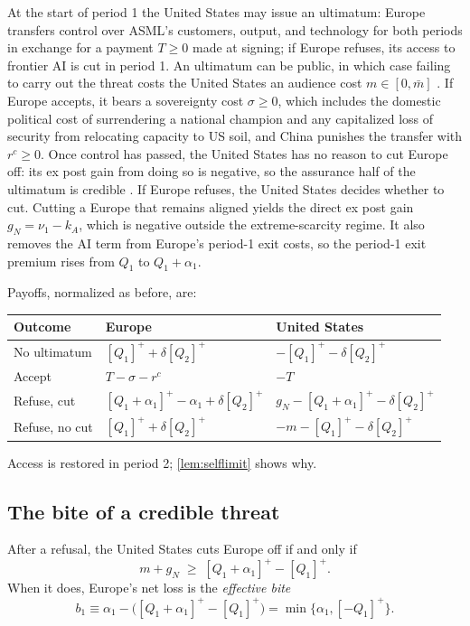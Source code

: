 At the start of period 1 the United States may issue an ultimatum: Europe transfers control over ASML's customers, output, and technology for both periods in exchange for a payment $T \geq 0$ made at signing; if Europe refuses, its access to frontier AI is cut in period 1. An ultimatum can be public, in which case failing to carry out the threat costs the United States an audience cost $m \in [0,\bar m]$ \citep{fearon1994domestic}. If Europe accepts, it bears a sovereignty cost $\sigma \geq 0$, which includes the domestic political cost of surrendering a national champion and any capitalized loss of security from relocating capacity to US soil, and China punishes the transfer with $r^c \geq 0$. Once control has passed, the United States has no reason to cut Europe off: its ex post gain from doing so is negative, so the assurance half of the ultimatum is credible \citep{cebul2021coercion}. If Europe refuses, the United States decides whether to cut. Cutting a Europe that remains aligned yields the direct ex post gain $g_N = \nu_1 - k_A$, which is negative outside the extreme-scarcity regime. It also removes the AI term from Europe's period-1 exit costs, so the period-1 exit premium rises from $Q_1$ to $Q_1 + \alpha_1$.

Payoffs, normalized as before, are:
\begin{center}
\begin{tabular}{lll}
\toprule
Outcome & Europe & United States\\
\midrule
No ultimatum & $[Q_1]^+ + \delta[Q_2]^+$ & $-[Q_1]^+ - \delta[Q_2]^+$\\
Accept & $T - \sigma - r^c$ & $-T$\\
Refuse, cut & $[Q_1+\alpha_1]^+ - \alpha_1 + \delta[Q_2]^+$ & $g_N - [Q_1+\alpha_1]^+ - \delta[Q_2]^+$\\
Refuse, no cut & $[Q_1]^+ + \delta[Q_2]^+$ & $-m - [Q_1]^+ - \delta[Q_2]^+$\\
\bottomrule
\end{tabular}
\end{center}
Access is restored in period 2; \cref{lem:selflimit} shows why.

\subsection{The bite of a credible threat}

\begin{lemma}\label{lem:bite}
After a refusal, the United States cuts Europe off if and only if
\begin{equation}\label{eq:credcut}
m + g_N \;\geq\; [Q_1+\alpha_1]^+ - [Q_1]^+ .
\end{equation}
When it does, Europe's net loss is the \emph{effective bite}
\begin{equation}\label{eq:bite}
b_1 \equiv \alpha_1 - \big([Q_1+\alpha_1]^+ - [Q_1]^+\big) = \min\{\alpha_1, [-Q_1]^+\}.
\end{equation}
\end{lemma}

